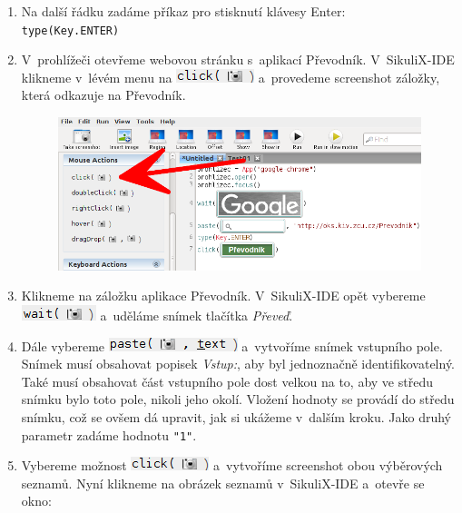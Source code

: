 \begin{enumerate}
\begin{figure}[ht!]
					\end{figure}
					\FloatBarrier
				\item Na další řádku zadáme příkaz pro stisknutí klávesy Enter:\\\texttt{type(Key.ENTER)}
				\item V~prohlížeči otevřeme webovou stránku s~aplikací Převodník. V~SikuliX-IDE klikneme v~lévém menu na \includegraphics[scale=0.7]{img/PrvniSkript/click.png} a~provedeme screenshot záložky, která odkazuje na Převodník.
					\begin{figure}[ht!]
						\centering
						\includegraphics[width=12.5cm]{img/PrvniSkript/krok7.png}
					\end{figure}
					\FloatBarrier
				\item Klikneme na záložku aplikace Převodník. V~SikuliX-IDE opět vybereme \includegraphics[scale=0.7]{img/PrvniSkript/wait.png} a~uděláme snímek tlačítka \emph{Převeď}.
				\item Dále vybereme \includegraphics[scale=0.7]{img/PrvniSkript/paste.png} a~vytvoříme snímek vstupního pole. Snímek musí obsahovat popisek \emph{Vstup:}, aby byl jednoznačně identifikovatelný. Také musí obsahovat část vstupního pole dost velkou na to, aby ve středu snímku bylo toto pole, nikoli jeho okolí. Vložení hodnoty se provádí do středu snímku, což se ovšem dá upravit, jak si ukážeme v~dalším kroku. Jako druhý parametr zadáme hodnotu \texttt{"1"}.
				\item Vybereme možnost \includegraphics[scale=0.7]{img/PrvniSkript/click.png} a~vytvoříme screenshot obou výběrových seznamů. Nyní klikneme na obrázek seznamů v~SikuliX-IDE a~otevře se okno:

\end{enumerate}
